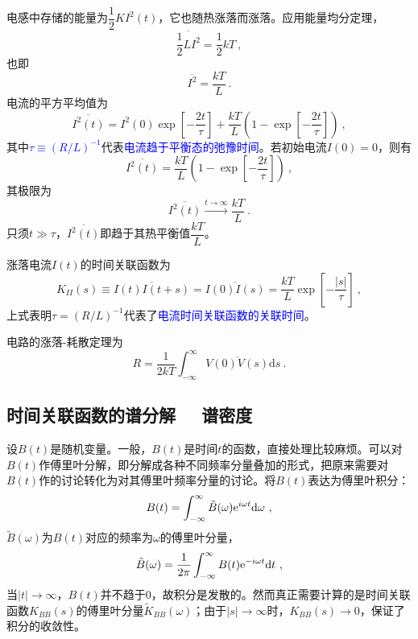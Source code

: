 \documentclass[11pt,a4paper]{article}
\newcommand{\dif}{\mathrm{d}}
\begin{document}
电感中存储的能量为$\dfrac{1}{2}KI^2(t)$，它也随热涨落而涨落。应用能量均分定理，
\begin{equation}
\overline{\dfrac{1}{2}LI^2} = \dfrac{1}{2} kT ~,
\end{equation}
也即
\begin{equation}
\overline{I^2} = \dfrac{kT}{L} ~.
\end{equation}
电流的平方平均值为
\begin{equation}
\overline{I^2(t)} = I^2(0) \exp \left[-\dfrac{2t}{\tau} \right] +\dfrac{kT}{L} \left(1 -\exp\left[-\dfrac{2t}{\tau} \right] \right) ~,
\end{equation}
其中\textcolor{blue}{$\tau \equiv (R/L)^{-1}$}代表\textcolor{blue}{电流趋于平衡态的弛豫时间}。若初始电流$I(0) = 0$，则有
\begin{equation}
\overline{I^2(t)} = \dfrac{kT}{L}\left(1 -\exp\left[-\dfrac{2t}{\tau} \right] \right) ~,
\end{equation}
其极限为
\begin{equation}
\overline{I^2(t)} \xrightarrow[]{t \rightarrow \infty} \dfrac{kT}{L} ~.
\end{equation}
只须$t \gg \tau$，$\overline{I^2(t)}$即趋于其热平衡值$\dfrac{kT}{L}$。

涨落电流$I(t)$的时间关联函数为
\begin{equation}
K_{II}(s) \equiv \overline{I(t)I(t+s)} = \overline{I(0)I(s)} = \dfrac{kT}{L} \exp\left[-\dfrac{|s|}{\tau} \right]~,
\end{equation}
上式表明$\tau = (R/L)^{-1}$代表了\textcolor{blue}{电流时间关联函数的关联时间}。

电路的涨落-耗散定理为
\begin{equation}
R = \dfrac{1}{2kT} \int_{-\infty}^\infty \overline{V(0)V(s)} \dif s ~.
\end{equation}

\subsection{时间关联函数的谱分解~~ 谱密度}
设$B(t)$是随机变量。一般，$B(t)$是时间$t$的函数，直接处理比较麻烦。可以对$B(t)$作傅里叶分解，即分解成各种不同频率分量叠加的形式，把原来需要对$B(t)$作的讨论转化为对其傅里叶频率分量的讨论。将$B(t)$表达为傅里叶积分：
\begin{equation}
B(t) = \int_{-\infty}^\infty \tilde{B}(\omega) {\rm e}^{i\omega t} \dif \omega ~,
\end{equation}
$\tilde{B}(\omega)$为$B(t)$对应的频率为$\omega$的傅里叶分量，
\begin{equation}
\tilde{B}(\omega) = \dfrac{1}{2\pi} \int_{-\infty}^\infty B(t) {\rm e}^{-i\omega t} \dif t ~,
\end{equation}
当$|t|\rightarrow \infty$，$B(t)$并不趋于$0$，故积分是发散的。然而真正需要计算的是时间关联函数$K_{BB}(s)$的傅里叶分量$\tilde{K}_{BB}(\omega)$；由于$|s|\rightarrow \infty$时，$K_{BB}(s) \rightarrow 0$，保证了积分的收敛性。
\end{document}
